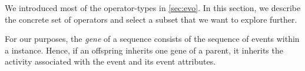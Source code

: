 \documentclass[./../../paper.tex]{subfiles}
\begin{document}





We introduced most of the operator-types in \autoref{sec:evo}.
In this section, we describe the concrete set of operators and select a subset that we want to explore further.

For our purposes, the \emph{gene} of a sequence consists of the sequence of events within a \gls{instance}. Hence, if an offspring inherits one gene of a parent, it inherits the activity associated with the event and its event attributes.
\end{document}
